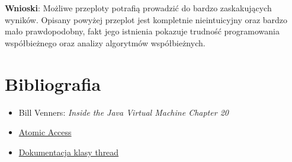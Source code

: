 \documentclass[11pt]{article}
\begin{document}
\textbf{Wnioski}: Możliwe przeploty potrafią prowadzić do bardzo zaskakujących wyników.
Opisany powyżej przeplot jest kompletnie nieintuicyjny oraz bardzo mało prawdopodobny,
fakt jego istnienia pokazuje trudność programowania współbieżnego oraz analizy
algorytmów współbieżnych.
\section*{Bibliografia}
\label{sec:org406d8f5}
\begin{itemize}
\item Bill Venners: \emph{Inside the Java Virtual Machine Chapter 20}
\item \href{https://docs.oracle.com/javase/tutorial/essential/concurrency/atomic.html}{Atomic Access}
\item \href{https://download.java.net/java/early\_access/valhalla/docs/api/java.base/java/lang/Thread.html}{Dokumentacja klasy thread}
\end{itemize}
\end{document}
